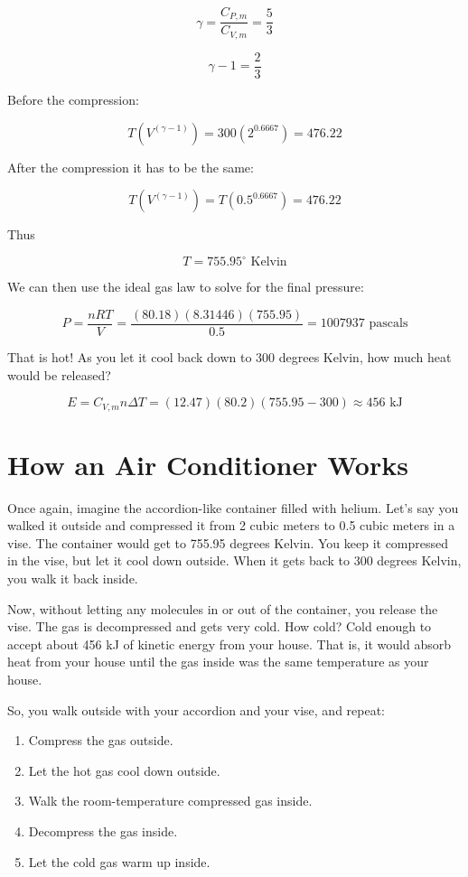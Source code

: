 $$\gamma = \frac{C_{P,m}}{C_{V,m}} = \frac{5}{3}$$

$$\gamma - 1 = \frac{2}{3}$$

Before the compression: 

$$T \left(V^{\left( \gamma - 1 \right)} \right) = 300 \left( 2^{0.6667} \right) = 476.22$$

After the compression it has to be the same:

$$T \left(V^{\left( \gamma - 1 \right)} \right) = T \left( 0.5^{0.6667} \right) = 476.22$$

Thus 

$$T = 755.95^\circ \text{ Kelvin}$$

We can then use the ideal gas law to solve for the final pressure:

$$P = \frac{n R T}{V} = \frac{(80.18)(8.31446)(755.95)}{0.5} = 1007937 \text{ pascals}$$

That is hot! As you let it cool back down to 300 degrees Kelvin, how much heat would be released? 

$$E = C_{V,m} n \Delta T = (12.47)(80.2)(755.95 - 300) \approx 456 \text{ kJ}$$

\section{How an Air Conditioner Works}

Once again, imagine the accordion-like container filled with helium. Let's say you walked it outside and compressed it from 2 cubic meters to 0.5 cubic meters in a vise. The container would get to 755.95 degrees Kelvin. You keep it compressed in the vise, but let it cool down outside. When it gets back to 300 degrees Kelvin, you walk it back inside.

Now, without letting any molecules in or out of the container, you release the vise. The gas is decompressed and gets very cold. How cold? Cold enough to accept about 456 kJ of kinetic energy from your house. That is, it would absorb heat from your house until the gas inside was the same temperature as your house.

So, you walk outside with your accordion and your vise, and repeat:
\begin{enumerate}
\item Compress the gas outside.
\item Let the hot gas cool down outside.
\item Walk the room-temperature compressed gas inside.
\item Decompress the gas inside.
\item Let the cold gas warm up inside.
\end{enumerate}

